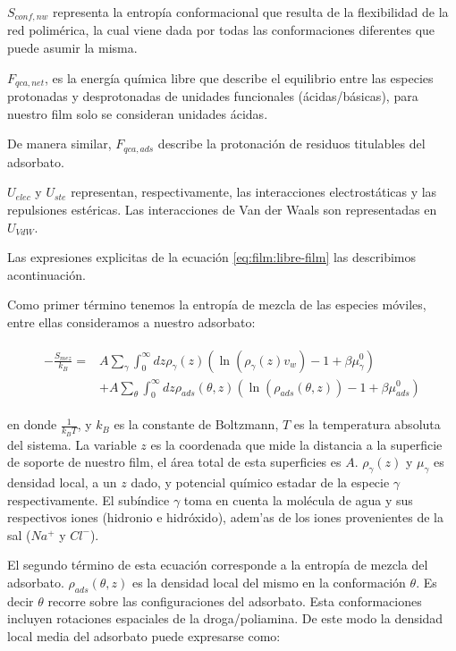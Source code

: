 $S_{conf,nw}$ representa la entrop\'ia conformacional que resulta de la flexibilidad de la red polim\'erica, la cual viene dada por todas las conformaciones diferentes que puede asumir la misma.

$F_{qca,net}$, es la energ\'ia qu\'imica libre que describe el equilibrio entre las especies protonadas y desprotonadas de unidades funcionales (\'acidas/b\'asicas), para nuestro film solo se consideran unidades \'acidas.

De manera similar, $F_{qca,ads}$ describe la protonaci\'on de residuos titulables del adsorbato.

$U_{elec}$ y $U_{ste}$ representan, respectivamente, las interacciones electrost\'aticas y las repulsiones est\'ericas.
Las interacciones de Van der Waals son representadas en $U_{VdW}$.


Las expresiones explicitas de la ecuaci\'on \ref{eq:film:libre-film} las describimos acontinuaci\'on.

Como primer t\'ermino tenemos la entrop\'ia de mezcla de  las especies m\'oviles, entre ellas consideramos a nuestro adsorbato: 

\begin{align}
	\begin{aligned}
		-\frac{S_{mez}}{k_B}= &A\sum_{\gamma}\int_0^\infty{dz\rho_\gamma(z)\left(\ln \left(\rho_\gamma (z)v_w\right) -1 + \beta\mu^0_\gamma\right)} \\
		&+ A\sum_{\theta}\int_0^\infty{dz\rho_{ads}(\theta,z)\left(\ln \left(\rho_{ads}(\theta,z)\right) -1 + \beta\mu^0_{ads} \right)}
	\end{aligned}
\end{align}

\noindent en donde $\frac{1}{k_B T}$, y $k_B$ es la constante de Boltzmann, $T$ es la temperatura absoluta del sistema. La variable $z$ es la coordenada que mide la distancia a la superficie de soporte de nuestro film, el \'area total de esta superficies es $A$. $\rho_\gamma(z)$ y $\mu_\gamma$ es densidad local, a un $z$ dado, y potencial qu\'imico estadar de la especie $\gamma$ respectivamente.
El sub\'indice $\gamma$ toma en cuenta la mol\'ecula de agua y sus respectivos iones (hidronio e hidr\'oxido), adem'as de los iones provenientes de la sal ($Na^+$ y $Cl^-$). 


El segundo t\'ermino de esta ecuaci\'on corresponde a la entrop\'ia de mezcla del adsorbato. $\rho_{ads}(\theta,z)$ es la densidad local del mismo en la conformaci\'on $\theta$. Es decir $\theta$ recorre sobre las configuraciones del adsorbato.
Esta conformaciones incluyen rotaciones espaciales de la droga/poliamina.
De este modo la densidad local media del adsorbato  puede expresarse como:


